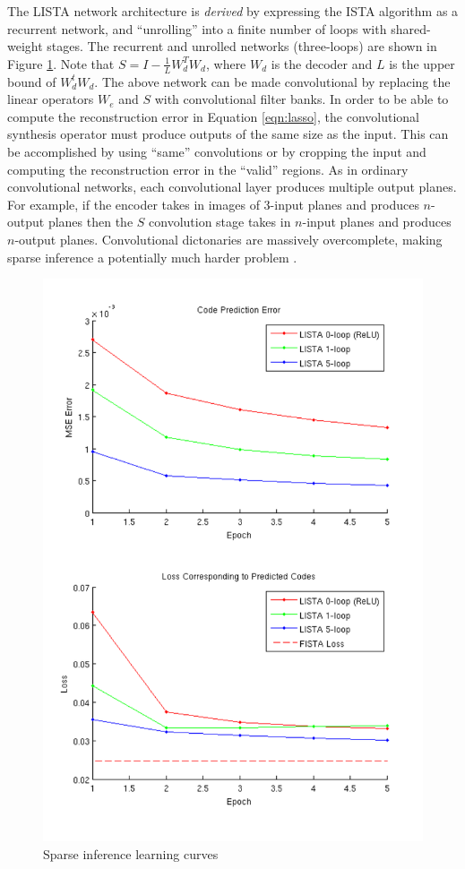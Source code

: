 The LISTA network architecture is \emph{derived} by expressing the ISTA
algorithm as a recurrent network, and ``unrolling'' into a finite number of
loops with shared-weight stages.  The recurrent and unrolled networks
(three-loops) are shown in Figure \ref{fig:LISTA}. Note that
$S=I-\frac{1}{L}W_d^T W_d$, where $W_d$ is the decoder and $L$ is the upper
bound of $W_d^t W_d$.  The above network can be made convolutional by replacing
the linear operators $W_e$ and $S$ with convolutional filter banks. In order to
be able to compute the reconstruction error in Equation \ref{eqn:lasso}, the
convolutional synthesis operator must produce outputs of the same size as the
input. This can be accomplished by using ``same'' convolutions or by cropping
the input and computing the reconstruction error in the ``valid'' regions. As
in ordinary convolutional networks, each convolutional layer produces multiple
output planes. For example, if the encoder takes in images of 3-input planes
and produces $n$-output planes then the $S$ convolution stage takes in
$n$-input planes and produces $n$-output planes. Convolutional dictonaries are
massively overcomplete, making sparse inference a potentially much
harder problem \cite{ConvSC}. 
     
\begin{figure}
\centering
\includegraphics[scale=0.6]{./figures/LISTA/code_pred.pdf}
\caption{Sparse inference learning curves} 
\label{fig:LISTA} 
\end{figure}  


